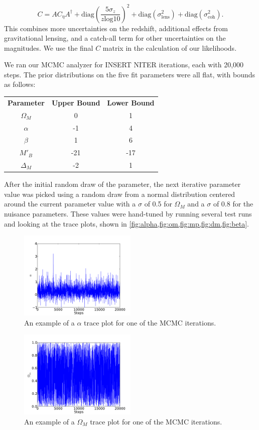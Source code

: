 \documentclass[aps,prl,reprint]{revtex4-1}
\begin{document}
$$C = A C_\eta A^\dagger + \text{diag}(\frac{5\sigma_z}{z \text{log} 10})^2 + \text{diag}(\sigma_\text{lens}^2) + \text{diag}(\sigma_{\text{coh}}^2). $$
This combines more uncertainties on the redshift, additional effects from gravitational lensing, and a catch-all term for other uncertainties on the magnitudes. We use the final $C$ matrix in the calculation of our likelihoods. 
\par We ran our MCMC analyzer for INSERT NITER iterations, each with 20,000 steps. The prior distributions on the five fit parameters were all flat, with bounds as follows:
\begin{center}
\begin{tabular}{ |c|c|c| } 
 \hline
 \textbf{Parameter} & \textbf{Upper Bound} & \textbf{Lower Bound} \\ 
 $\Omega_M$ & 0 & 1 \\ 
 $\alpha$ & -1 & 4 \\ 
 $\beta$ & 1 & 6 \\ 
 $M'_B$ & -21 & -17 \\ 
$\Delta_M$ & -2 & 1 \\ 
 \hline
\end{tabular}
\end{center}
\par After the initial random draw of the parameter, the next iterative parameter value was picked using a random draw from a normal distribution centered around the current parameter value with a $\sigma$ of 0.5 for $\Omega_M$ and a $\sigma$ of 0.8 for the nuisance parameters. These values were hand-tuned by running several test runs and looking at the trace plots, shown in \cref{fig:alpha,fig:om,fig:mp,fig:dm,fig:beta}. 
\begin{figure}
 \includegraphics[width=0.5\textwidth]{../plots/alpha.pdf}
\caption{\label{fig:alpha}An example of a $\alpha$ trace plot for one of the MCMC iterations.}
\end{figure}
\begin{figure}
 \includegraphics[width=0.5\textwidth]{../plots/om.pdf}
\caption{\label{fig:om}An example of a $\Omega_M$ trace plot for one of the MCMC iterations.}
\end{figure}
\end{document}
